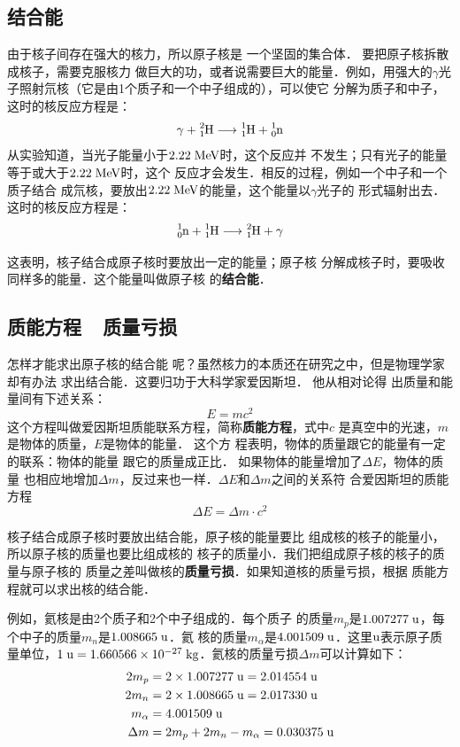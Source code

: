 \subsection{结合能}

由于核子间存在强大的核力，所以原子核是
一个坚固的集合体．
要把原子核拆散成核子，需要克服核力
做巨大的功，或者说需要巨大的能量．例如，用强大的$\gamma$光
子照射氘核（它是由1个质子和一个中子组成的），可以使它
分解为质子和中子，这时的核反应方程是：
\[\gamma +\atom{H}{2}{1}\longrightarrow \atom{H}{1}{1}+\atom{n}{1}{0} \]
从实验知道，当光子能量小于$2.22\;\text{MeV}$时，这个反应并
不发生；只有光子的能量等于或大于$2.22\;\text{MeV}$时，这个
反应才会发生．相反的过程，例如一个中子和一个质子结合
成氘核，要放出$2.22\;\text{MeV}$的能量，这个能量以$\gamma$光子的
形式辐射出去．这时的核反应方程是：
\[\atom{n}{1}{0}+ \atom{H}{1}{1}\longrightarrow \atom{H}{2}{1} +\gamma  \]

这表明，核子结合成原子核时要放出一定的能量；原子核
分解成核子时，要吸收同样多的能量．这个能量叫做原子核
的\textbf{结合能}．

\subsection{质能方程~~质量亏损}

怎样才能求出原子核的结合能
呢？虽然核力的本质还在研究之中，但是物理学家却有办法
求出结合能．这要归功于大科学家爱因斯坦．
他从相对论得
出质量和能量间有下述关系：
\[E=mc^2\]
这个方程叫做爱因斯坦质能联系方程，简称\textbf{质能方程}，式中$c$
是真空中的光速，$m$是物体的质量，$E$是物体的能量．
这个方
程表明，物体的质量跟它的能量有一定的联系：物体的能量
跟它的质量成正比．
如果物体的能量增加了$\Delta E$，物体的质量
也相应地增加$\Delta m$，反过来也一样．$\Delta E$和$\Delta m$之间的关系符
合爱因斯坦的质能方程
\[\Delta E=\Delta m\cdot c^2\]

核子结合成原子核时要放出结合能，原子核的能量要比
组成核的核子的能量小，所以原子核的质量也要比组成核的
核子的质量小．我们把组成原子核的核子的质量与原子核的
质量之差叫做核的\textbf{质量亏损}．如果知道核的质量亏损，根据
质能方程就可以求出核的结合能．

例如，氦核是由2个质子和2个中子组成的．每个质子
的质量$m_p$是$1.007277 \;\text{u}$，每个中子的质量$m_n$是$1.008665 \;\text{u}$．氦
核的质量$m_{\alpha}$是$4.001509 \;\text{u}$．这里$\text{u}$表示原子质量单位，$1 \;\text{u} =
1.660566\times10^{-27} \;\text{kg} $．氦核的质量亏损$\Delta m$可以计算如下：
\[\begin{split}
    2m_p&=2\times1.007277\;\text{u}=2.014554\;\text{u}\\
    2m_n&=2\times1.008665\;\text{u}=2.017330\;\text{u}\\
    m_{\alpha}&=4.001509\;\text{u}\\
    \Delta m&=2m_p+2m_n-m_{\alpha}=0.030375\;\text{u}\\
\end{split}\]

